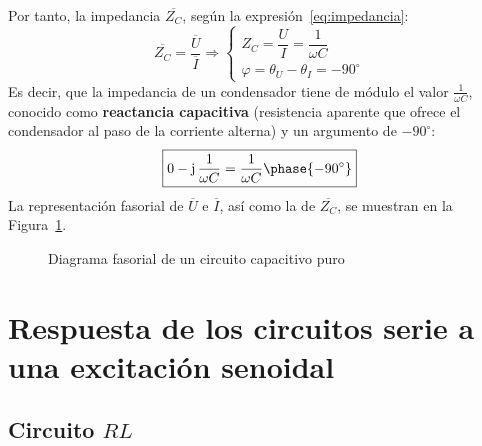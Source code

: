 Por tanto, la impedancia $\overline{Z_C}$, según la
expresión~\eqref{eq:impedancia}:
\begin{equation*}
  \overline{Z_C}=\dfrac{\overline{U}}{\overline{I}}\Rightarrow
  \begin{cases}
    Z_C=\dfrac{U}{I}=\dfrac{1}{\omega C}\\
    \varphi=\theta_U-\theta_I=-90^\circ
  \end{cases}
\end{equation*}
Es decir, que la impedancia de un condensador tiene de módulo el valor
$\frac{1}{\omega C}$, conocido como \textbf{reactancia capacitiva}
(resistencia aparente que ofrece el condensador al paso de la
corriente alterna) y un argumento de $-90^\circ$:
\begin{equation}
  \boxed{0-\mathrm{j}\,\dfrac{1}{\omega C}=\dfrac{1}{\omega C}\phase{-90^\circ}}
\end{equation}
La representación fasorial de $\overline{U}$ e $\overline{I}$, así
como la de $\overline{Z_C}$, se muestran en la
Figura~\ref{fig:fasorCondensador}.
\begin{figure}[H]
  \centering {}\hfil
  \caption{Diagrama fasorial de un circuito capacitivo puro}
  \label{fig:fasorCondensador}
\end{figure}
	
\section{Respuesta de los circuitos serie a una excitación
  senoidal} \label{sec:respuesta_serie}
	
\subsection{Circuito $RL$}\label{sec:RL}
	
